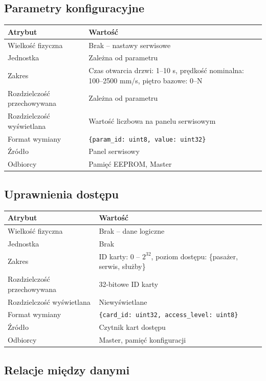 \documentclass[12pt,a4paper]{article}
\begin{document}
\subsection{Parametry konfiguracyjne}

\begin{tabularx}{\textwidth}{lX}
\toprule
\textbf{Atrybut} & \textbf{Wartość} \\
\midrule
Wielkość fizyczna & Brak -- nastawy serwisowe \\
Jednostka & Zależna od parametru \\
Zakres & Czas otwarcia drzwi: 1--10 s, prędkość nominalna: 100--2500 mm/s, piętro bazowe: 0--N \\
Rozdzielczość przechowywana & Zależna od parametru \\
Rozdzielczość wyświetlana & Wartość liczbowa na panelu serwisowym \\
Format wymiany & \texttt{\{param\_id: uint8, value: uint32\}} \\
Źródło & Panel serwisowy \\
Odbiorcy & Pamięć EEPROM, Master \\
\bottomrule
\end{tabularx}

\subsection{Uprawnienia dostępu}

\begin{tabularx}{\textwidth}{lX}
\toprule
\textbf{Atrybut} & \textbf{Wartość} \\
\midrule
Wielkość fizyczna & Brak -- dane logiczne \\
Jednostka & Brak \\
Zakres & ID karty: 0 -- $2^{32}$, poziom dostępu: \{pasażer, serwis, służby\} \\
Rozdzielczość przechowywana & 32-bitowe ID karty \\
Rozdzielczość wyświetlana & Niewyświetlane \\
Format wymiany & \texttt{\{card\_id: uint32, access\_level: uint8\}} \\
Źródło & Czytnik kart dostępu \\
Odbiorcy & Master, pamięć konfiguracji \\
\bottomrule
\end{tabularx}

\subsection{Relacje między danymi}
\end{document}
